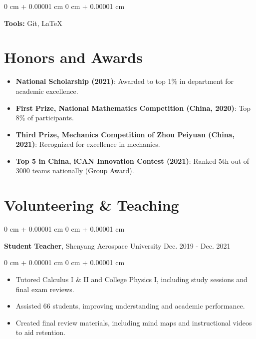 \documentclass[10pt, letterpaper]{article}
\newenvironment{highlights}{
    \begin{itemize}[
        topsep=0.10 cm,
        parsep=0.10 cm,
        partopsep=0pt,
        itemsep=0pt,
        leftmargin=0 cm + 10pt
    ]
}{
    \end{itemize}
} %
\newenvironment{onecolentry}{
    \begin{adjustwidth}{
        0 cm + 0.00001 cm
    }{
        0 cm + 0.00001 cm
    }
}{
    \end{adjustwidth}
} %
\newenvironment{twocolentry}[2][]{
    \onecolentry
    \def\secondColumn{#2}
    \setcolumnwidth{\fill, 4.5 cm}
    \begin{paracol}{2}
}{ 
    \switchcolumn \raggedleft \secondColumn
    \end{paracol}
    \endonecolentry
} %
\begin{document}
    \begin{onecolentry}
        \textbf{Tools:} Git, \LaTeX 
    \end{onecolentry}


    \section{Honors and Awards}

    \begin{highlights}
        \item \textbf{National Scholarship (2021)}: Awarded to top 1\% in department for academic excellence.
        \item \textbf{First Prize, National Mathematics Competition (China, 2020)}: Top 8\% of participants.
        \item \textbf{Third Prize, Mechanics Competition of Zhou Peiyuan (China, 2021)}: Recognized for excellence in mechanics.
        \item \textbf{Top 5 in China, iCAN Innovation Contest (2021)}: Ranked 5th out of 3000 teams nationally (Group Award).
    \end{highlights}

    \vspace{0.2 cm}

    \section{Volunteering \& Teaching}

    \begin{twocolentry}{
        Dec. 2019 - Dec. 2021
    }
        \textbf{Student Teacher}, Shenyang Aerospace University\end{twocolentry}

    \vspace{0.10 cm}
    \begin{onecolentry}
        \begin{highlights}
            \item Tutored Calculus I \& II and College Physics I, including study sessions and final exam reviews.
            \item Assisted 66 students, improving understanding and academic performance.
            \item Created final review materials, including mind maps and instructional videos to aid retention.
        \end{highlights}
    \end{onecolentry}
\end{document}
